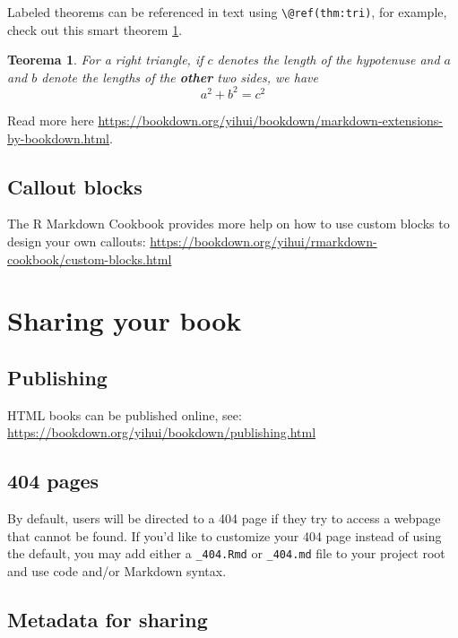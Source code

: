 \documentclass[
]{book}
\newtheorem{theorem}{Teorema}
\begin{document}
Labeled theorems can be referenced in text using \texttt{\textbackslash{}@ref(thm:tri)}, for example, check out this smart theorem \ref{thm:tri}.

\begin{theorem}
\protect\hypertarget{thm:tri}{}\label{thm:tri}For a right triangle, if \(c\) denotes the \emph{length} of the hypotenuse
and \(a\) and \(b\) denote the lengths of the \textbf{other} two sides, we have
\[a^2 + b^2 = c^2\]
\end{theorem}

Read more here \url{https://bookdown.org/yihui/bookdown/markdown-extensions-by-bookdown.html}.

\hypertarget{callout-blocks}{%
\section{Callout blocks}\label{callout-blocks}}

The R Markdown Cookbook provides more help on how to use custom blocks to design your own callouts: \url{https://bookdown.org/yihui/rmarkdown-cookbook/custom-blocks.html}

\hypertarget{sharing-your-book}{%
\chapter{Sharing your book}\label{sharing-your-book}}

\hypertarget{publishing}{%
\section{Publishing}\label{publishing}}

HTML books can be published online, see: \url{https://bookdown.org/yihui/bookdown/publishing.html}

\hypertarget{pages}{%
\section{404 pages}\label{pages}}

By default, users will be directed to a 404 page if they try to access a webpage that cannot be found. If you'd like to customize your 404 page instead of using the default, you may add either a \texttt{\_404.Rmd} or \texttt{\_404.md} file to your project root and use code and/or Markdown syntax.

\hypertarget{metadata-for-sharing}{%
\section{Metadata for sharing}\label{metadata-for-sharing}}
\end{document}
